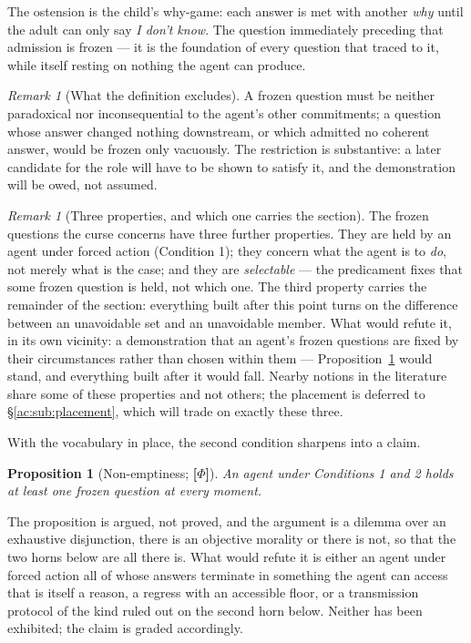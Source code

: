 \documentclass[11pt]{article}
\numberwithin{equation}{section}
\theoremstyle{plain}
\newtheorem{proposition}[theorem]{Proposition}
\theoremstyle{definition}
\theoremstyle{remark}
\newtheorem{remark}[theorem]{Remark}
\begin{document}
The ostension is the child's why-game: each answer is met with another \emph{why} until the adult can only say \emph{I don't know}. The question immediately preceding that admission is frozen --- it is the foundation of every question that traced to it, while itself resting on nothing the agent can produce.

\begin{remark}[What the definition excludes]\label{ac:rem:admissible}
A frozen question must be neither paradoxical nor inconsequential to the agent's other commitments; a question whose answer changed nothing downstream, or which admitted no coherent answer, would be frozen only vacuously. The restriction is substantive: a later candidate for the role will have to be shown to satisfy it, and the demonstration will be owed, not assumed.
\end{remark}

\begin{remark}[Three properties, and which one carries the section]\label{ac:rem:threeprops}
The frozen questions the curse concerns have three further properties. They are held by an agent under forced action (Condition 1); they concern what the agent is to \emph{do}, not merely what is the case; and they are \emph{selectable} --- the predicament fixes that some frozen question is held, not which one. The third property carries the remainder of the section: everything built after this point turns on the difference between an unavoidable set and an unavoidable member. What would refute it, in its own vicinity: a demonstration that an agent's frozen questions are fixed by their circumstances rather than chosen within them --- Proposition~\ref{ac:prop:nonempty} would stand, and everything built after it would fall. Nearby notions in the literature share some of these properties and not others; the placement is deferred to \S\ref{ac:sub:placement}, which will trade on exactly these three.
\end{remark}

With the vocabulary in place, the second condition sharpens into a claim.

\begin{proposition}[Non-emptiness; \textbf{[$\Phi$]}]\label{ac:prop:nonempty}
An agent under Conditions 1 and 2 holds at least one frozen question at every moment.
\end{proposition}

The proposition is argued, not proved, and the argument is a dilemma over an exhaustive disjunction, there is an objective morality or there is not, so that the two horns below are all there is. What would refute it is either an agent under forced action all of whose answers terminate in something the agent can access that is itself a reason, a regress with an accessible floor, or a transmission protocol of the kind ruled out on the second horn below. Neither has been exhibited; the claim is graded accordingly.
\end{document}
